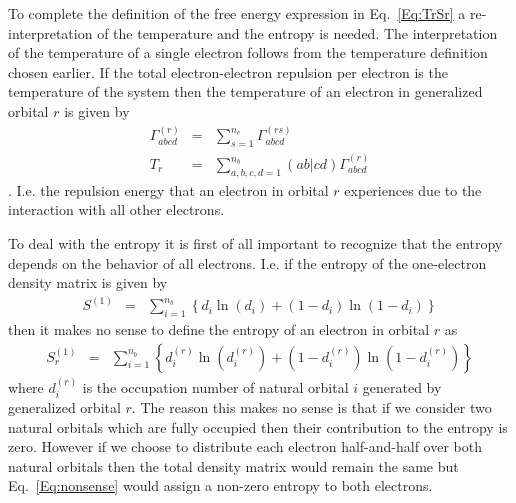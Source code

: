 \documentclass[pra]{revtex4-1}
\begin{document}
To complete the definition of the free energy expression in Eq.~\ref{Eq:TrSr} a 
re-interpretation of the temperature and the entropy is needed. The interpretation
of the temperature of a single electron follows from the temperature definition 
chosen earlier. If the total electron-electron repulsion per electron is the 
temperature of the system then the temperature of an electron in generalized 
orbital $r$ is given by
\begin{eqnarray}
   \Gamma_{abcd}^{(r)} &=& \sum_{s=1}^{n_e}\Gamma_{abcd}^{(rs)} 
   \label{Eq:Gr} \\
   T_{r} &=& \sum_{a,b,c,d=1}^{n_b}(ab|cd)\Gamma_{abcd}^{(r)}
   \label{Eq:Tr}
\end{eqnarray}.
I.e. the repulsion energy that an electron in orbital $r$ experiences due to the
interaction with all other electrons.

To deal with the entropy it is first of all important to recognize that the entropy
depends on the behavior of all electrons. I.e. if the entropy of the one-electron
density matrix is given by
\begin{eqnarray}
   S^{(1)} &=& \sum_{i=1}^{n_b}\left\{d_i\ln(d_i)+(1-d_i)\ln(1-d_i)\right\}
\end{eqnarray}
then it makes no sense to define the entropy of an electron in orbital $r$ as
\begin{eqnarray}
   S^{(1)}_r &=& \sum_{i=1}^{n_b}
           \left\{d_i^{(r)}\ln(d_i^{(r)})+(1-d_i^{(r)})\ln(1-d_i^{(r)})\right\}
   \label{Eq:nonsense}
\end{eqnarray}
where $d_i^{(r)}$ is the occupation number of natural orbital $i$ generated by
generalized orbital $r$. The reason this makes no sense is that if we consider two
natural orbitals which are fully occupied then their contribution to the entropy is
zero. However if we choose to distribute each electron half-and-half over both natural
orbitals then the total density matrix would remain the same but Eq.~\ref{Eq:nonsense}
would assign a non-zero entropy to both electrons.
\end{document}
